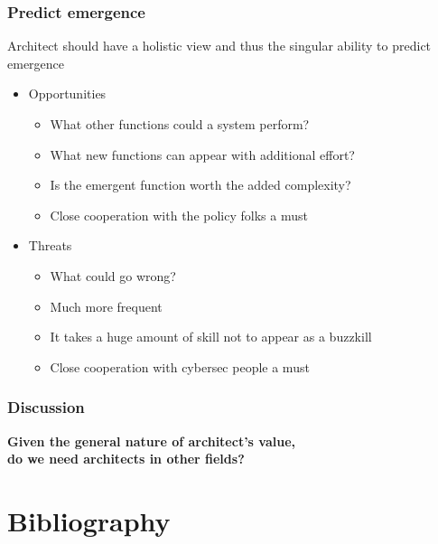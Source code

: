 \documentclass[10pt, compress]{beamer}
\begin{document}
\begin{frame}
	\frametitle{Predict emergence}
	
	Architect should have a holistic view and thus the singular ability to predict emergence
	\begin{itemize}
		\item Opportunities
		\begin{itemize}
			\item What other functions could a system perform?
			\item What new functions can appear with additional effort? 
			\item Is the emergent function worth the added complexity?
			\item Close cooperation with the policy folks a must
		\end{itemize}
		\item Threats
		\begin{itemize}
			\item What could go wrong?
			\item Much more frequent
			\item It takes a huge amount of skill not to appear as a buzzkill
			\item Close cooperation with cybersec people a must
		\end{itemize}
	\end{itemize}
\end{frame}

\begin{frame}[fragile]
  \frametitle{Discussion}
		\begin{center}
			\textbf{Given the general nature of architect's value, \\do we need architects in other fields?}
		\end{center}
\end{frame}

\section{Bibliography}

\begin{frame}[t,allowframebreaks,]
  	
	 

\end{frame}
\end{document}
